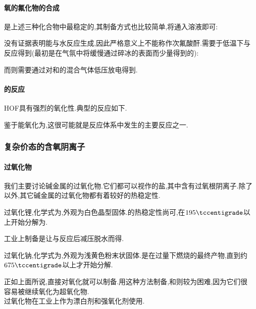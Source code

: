 \documentclass{ctexart}
\begin{document}
\paragraph{氧的氟化物的合成} 是上述三种化合物中最稳定的,其制备方式也比较简单,将通入溶液即可:
\begin{center}
\end{center}

\indent 没有证据表明能与水反应生成,因此严格意义上不能称作次氟酸酐.需要于低温下与反应得到(最初是在气氛中将缓慢通过碎冰的表面而少量得到的):
\begin{center}
\end{center}
\indent 而则需要通过对和的混合气体低压放电得到.
\paragraph{的反应}
HOF具有强烈的氧化性.典型的反应如下.
\begin{center}
\end{center}
鉴于能氧化为,这很可能就是反应体系中发生的主要反应之一.
\subsubsection{复杂价态的含氧阴离子}
\paragraph{过氧化物}
我们主要讨论碱金属的过氧化物.它们都可以视作的盐,其中含有过氧根阴离子.除了以外,其它碱金属的过氧化物都有着较好的热稳定性.
\begin{substance}[\ce{Li2O2}]
    过氧化锂,化学式为,外观为白色晶型固体.的热稳定性尚可,在$195\tccentigrade$以上开始分解为.
\end{substance}
工业上制备是让与反应后减压脱水而得.
\begin{substance}[\ce{Na2O2}]
    过氧化钠,化学式为,外观为浅黄色粉末状固体.是在过量下燃烧的最终产物,直到约$675\tccentigrade$以上才开始分解.
\end{substance}
正如上面所说,直接对氧化就可以制备.用这种方法制备,和则较为困难,因为它们很容易被继续氧化为超氧化物.\\
\indent 过氧化物在工业上作为漂白剂和强氧化剂使用.
\end{document}
